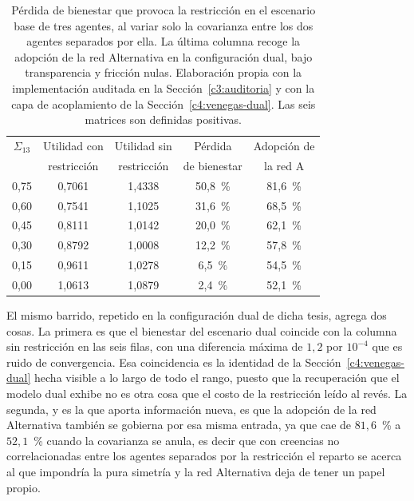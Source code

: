 \begin{table}[H]
    \centering
    \small
    \caption[Sensibilidad del costo de la restricción]{Pérdida de bienestar que
    provoca la restricción en el escenario base de tres agentes, al variar solo
    la covarianza entre los dos agentes separados por ella. La última columna
    recoge la adopción de la red Alternativa en la configuración dual, bajo
    transparencia y fricción nulas. Elaboración propia con la implementación
    auditada en la Sección~\ref{c3:auditoria} y con la capa de acoplamiento de
    la Sección~\ref{c4:venegas-dual}. Las seis matrices son definidas positivas.}
    \label{tab:sensibilidad-sigma13}
    \begin{tabular}{ccccc}
        \toprule
        $\Sigma_{13}$ & Utilidad con & Utilidad sin & Pérdida & Adopción de \\
         & restricción & restricción & de bienestar & la red A \\
        \midrule
        0,75 & 0,7061 & 1,4338 & 50,8~\% & 81,6~\% \\
        0,60 & 0,7541 & 1,1025 & 31,6~\% & 68,5~\% \\
        0,45 & 0,8111 & 1,0142 & 20,0~\% & 62,1~\% \\
        0,30 & 0,8792 & 1,0008 & 12,2~\% & 57,8~\% \\
        0,15 & 0,9611 & 1,0278 & 6,5~\% & 54,5~\% \\
        0,00 & 1,0613 & 1,0879 & 2,4~\% & 52,1~\% \\
        \bottomrule
    \end{tabular}
\end{table}

El mismo barrido, repetido en la configuración dual de dicha tesis, agrega dos
cosas. La primera es que el bienestar del escenario dual
coincide con la columna sin restricción en las seis filas, con una diferencia
máxima de $1,2$ por $10^{-4}$ que es ruido de convergencia. Esa coincidencia es
la identidad de la Sección~\ref{c4:venegas-dual} hecha visible a lo largo de todo
el rango, puesto que la recuperación que el modelo dual exhibe no es otra cosa
que el costo de la restricción leído al revés. La segunda, y es la que aporta
información nueva, es que la adopción de la red Alternativa también se gobierna
por esa misma entrada, ya que cae de $81,6$~\% a $52,1$~\% cuando la covarianza
se anula, es decir que con creencias no correlacionadas entre los agentes
separados por la restricción el reparto se acerca al que impondría la pura
simetría y la red Alternativa deja de tener un papel propio.

